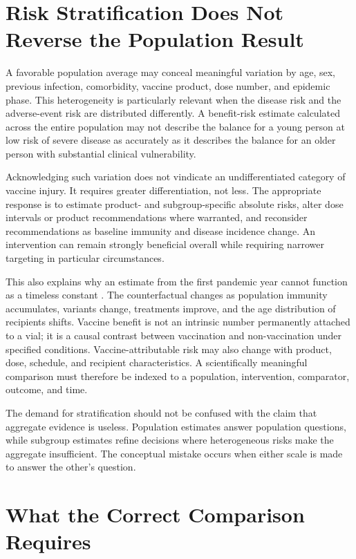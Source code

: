 \documentclass[11pt]{article}
\begin{document}
\section{Risk Stratification Does Not Reverse the Population Result}

A favorable population average may conceal meaningful variation by age, sex, previous infection, comorbidity, vaccine product, dose number, and epidemic phase. This heterogeneity is particularly relevant when the disease risk and the adverse-event risk are distributed differently. A benefit-risk estimate calculated across the entire population may not describe the balance for a young person at low risk of severe disease as accurately as it describes the balance for an older person with substantial clinical vulnerability.

Acknowledging such variation does not vindicate an undifferentiated category of vaccine injury. It requires greater differentiation, not less. The appropriate response is to estimate product- and subgroup-specific absolute risks, alter dose intervals or product recommendations where warranted, and reconsider recommendations as baseline immunity and disease incidence change. An intervention can remain strongly beneficial overall while requiring narrower targeting in particular circumstances.

This also explains why an estimate from the first pandemic year cannot function as a timeless constant \citep{watson2022}. The counterfactual changes as population immunity accumulates, variants change, treatments improve, and the age distribution of recipients shifts. Vaccine benefit is not an intrinsic number permanently attached to a vial; it is a causal contrast between vaccination and non-vaccination under specified conditions. Vaccine-attributable risk may also change with product, dose, schedule, and recipient characteristics. A scientifically meaningful comparison must therefore be indexed to a population, intervention, comparator, outcome, and time.

The demand for stratification should not be confused with the claim that aggregate evidence is useless. Population estimates answer population questions, while subgroup estimates refine decisions where heterogeneous risks make the aggregate insufficient. The conceptual mistake occurs when either scale is made to answer the other's question.

\section{What the Correct Comparison Requires}
\end{document}

